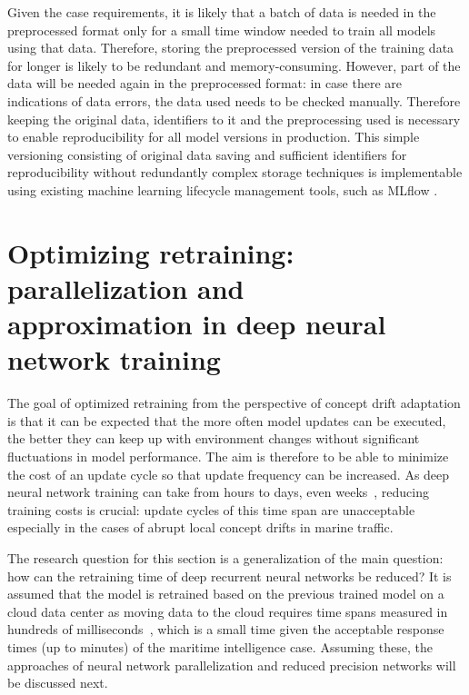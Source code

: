 Given the case requirements, it is likely that a batch of data is needed in the preprocessed format only for a small time window needed to train all models using that data. Therefore, storing the preprocessed version of the training data for longer is likely to be redundant and memory-consuming. However, part of the data will be needed again in the preprocessed format: in case there are indications of data errors, the data used needs to be checked manually. Therefore keeping the original data, identifiers to it and the preprocessing used is necessary to enable reproducibility for all model versions in production. This simple versioning consisting of original data saving and sufficient identifiers for reproducibility without redundantly complex storage techniques is implementable using existing machine learning lifecycle management tools, such as MLflow \cite{mlflow}.

\section[Optimizing retraining: parallelization and approximation in deep neural network training]{Optimizing retraining: parallelization and \\approximation in deep neural network training}



The goal of optimized retraining from the perspective of concept drift adaptation is that it can be expected that the more often model updates can be executed, the better they can keep up with environment changes without significant fluctuations in model performance. The aim is therefore to be able to minimize the cost of an update cycle so that update frequency can be increased. As deep neural network training can take from hours to days, even weeks~\cite{szeEfficientProcessingDeep2017}, reducing training costs is crucial: update cycles of this time span are unacceptable especially in the cases of abrupt local concept drifts in marine traffic.

The research question for this section is a generalization of the main question: how can the retraining time of deep recurrent neural networks be reduced? It is assumed that the model is retrained based on the previous trained model on a cloud data center as moving data to the cloud requires time spans measured in hundreds of milliseconds~\cite{edgelatency}, which is a small time given the acceptable response times (up to minutes) of the maritime intelligence case. Assuming these, the approaches of neural network parallelization and reduced precision networks will be discussed next.


